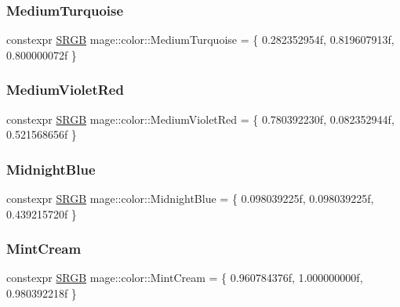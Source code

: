 \hypertarget{namespacemage_1_1color_ad4892535dcd05ab34c077e27406edff4}{}\label{namespacemage_1_1color_ad4892535dcd05ab34c077e27406edff4} 
\subsubsection{\texorpdfstring{Medium\+Turquoise}{MediumTurquoise}}
{\footnotesize\ttfamily constexpr \hyperlink{structmage_1_1_s_r_g_b}{S\+R\+GB} mage\+::color\+::\+Medium\+Turquoise = \{ 0.\+282352954f, 0.\+819607913f, 0.\+800000072f \}}

\hypertarget{namespacemage_1_1color_aabc2a8abdf89ae4494df5f6973421ce1}{}\label{namespacemage_1_1color_aabc2a8abdf89ae4494df5f6973421ce1} 
\subsubsection{\texorpdfstring{Medium\+Violet\+Red}{MediumVioletRed}}
{\footnotesize\ttfamily constexpr \hyperlink{structmage_1_1_s_r_g_b}{S\+R\+GB} mage\+::color\+::\+Medium\+Violet\+Red = \{ 0.\+780392230f, 0.\+082352944f, 0.\+521568656f \}}

\hypertarget{namespacemage_1_1color_af95cf1f370d9009ad1441d944e9b0cbf}{}\label{namespacemage_1_1color_af95cf1f370d9009ad1441d944e9b0cbf} 
\subsubsection{\texorpdfstring{Midnight\+Blue}{MidnightBlue}}
{\footnotesize\ttfamily constexpr \hyperlink{structmage_1_1_s_r_g_b}{S\+R\+GB} mage\+::color\+::\+Midnight\+Blue = \{ 0.\+098039225f, 0.\+098039225f, 0.\+439215720f \}}

\hypertarget{namespacemage_1_1color_a970786ca4973ba03a297331e517fab11}{}\label{namespacemage_1_1color_a970786ca4973ba03a297331e517fab11} 
\subsubsection{\texorpdfstring{Mint\+Cream}{MintCream}}
{\footnotesize\ttfamily constexpr \hyperlink{structmage_1_1_s_r_g_b}{S\+R\+GB} mage\+::color\+::\+Mint\+Cream = \{ 0.\+960784376f, 1.\+000000000f, 0.\+980392218f \}}

